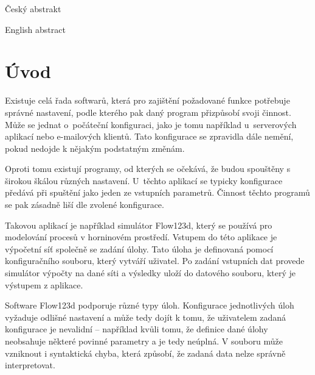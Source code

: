\documentclass[FM,bw,DP]{tulthesis}
\begin{document}

\begin{abstractCZ}
\thispagestyle{empty}
Český abstrakt
\end{abstractCZ}

\vspace{2cm}
\begin{abstractEN}
English abstract
\end{abstractEN}

\clearpage
\begin{acknowledgement}

\end{acknowledgement}

\setcounter{tocdepth}{1}
\tableofcontents
\clearpage

\begin{abbrList}
\end{abbrList}

\chapter*{Úvod}

Existuje celá řada softwarů, která pro zajištění požadované funkce potřebuje správné nastavení, podle kterého pak daný program přizpůsobí svoji činnost. Může se jednat o~počáteční konfiguraci, jako je tomu například u~serverových aplikací nebo e-mailových klientů. Tato konfigurace se zpravidla dále nemění, pokud nedojde k nějakým podstatným změnám.

Oproti tomu existují programy, od kterých se očekává, že budou spouštěny s širokou škálou různých nastavení. U~těchto aplikací se typicky konfigurace předává při spuštění jako jeden ze vstupních parametrů. Činnost těchto programů se pak zásadně liší dle zvolené konfigurace.

Takovou aplikací je například simulátor Flow123d, který se používá pro modelování procesů v horninovém prostředí. Vstupem do této aplikace je výpočetní síť společně se zadání úlohy. Tato úloha je definovaná pomocí konfiguračního souboru, který vytváří uživatel. Po zadání vstupních dat provede simulátor výpočty na dané síti a výsledky uloží do datového souboru, který je výstupem z aplikace.

Software Flow123d podporuje různé typy úloh. Konfigurace jednotlivých úloh vyžaduje odlišné nastavení a může tedy dojít k tomu, že uživatelem zadaná konfigurace je nevalidní -- například kvůli tomu, že definice dané úlohy neobsahuje některé povinné parametry a je tedy neúplná. V souboru může vzniknout i syntaktická chyba, která způsobí, že zadaná data nelze správně interpretovat.
\end{document}
